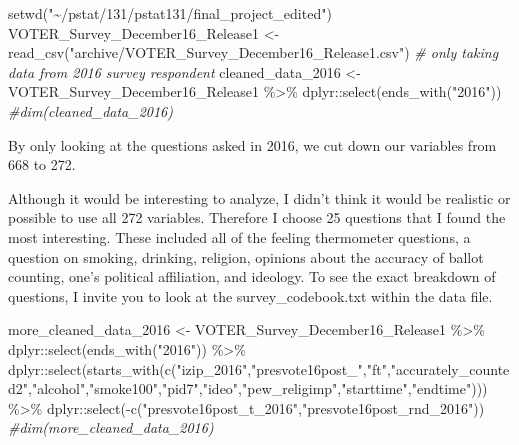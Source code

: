 \documentclass[
]{article}
\newenvironment{Shaded}{\begin{snugshade}}{\end{snugshade}}
\newcommand{\CommentTok}[1]{\textcolor[rgb]{0.56,0.35,0.01}{\textit{#1}}}
\newcommand{\FunctionTok}[1]{\textcolor[rgb]{0.00,0.00,0.00}{#1}}
\newcommand{\NormalTok}[1]{#1}
\newcommand{\OtherTok}[1]{\textcolor[rgb]{0.56,0.35,0.01}{#1}}
\newcommand{\SpecialCharTok}[1]{\textcolor[rgb]{0.00,0.00,0.00}{#1}}
\newcommand{\StringTok}[1]{\textcolor[rgb]{0.31,0.60,0.02}{#1}}
\begin{document}
\begin{Shaded}
\begin{Highlighting}[]
\FunctionTok{setwd}\NormalTok{(}\StringTok{"\textasciitilde{}/pstat/131/pstat131/final\_project\_edited"}\NormalTok{)}
\NormalTok{VOTER\_Survey\_December16\_Release1 }\OtherTok{\textless{}{-}} \FunctionTok{read\_csv}\NormalTok{(}\StringTok{"archive/VOTER\_Survey\_December16\_Release1.csv"}\NormalTok{)}
\CommentTok{\# only taking data from 2016 survey respondent }
\NormalTok{cleaned\_data\_2016 }\OtherTok{\textless{}{-}}\NormalTok{ VOTER\_Survey\_December16\_Release1 }\SpecialCharTok{\%\textgreater{}\%}
\NormalTok{  dplyr}\SpecialCharTok{::}\FunctionTok{select}\NormalTok{(}\FunctionTok{ends\_with}\NormalTok{(}\StringTok{"2016"}\NormalTok{))}
\CommentTok{\#dim(cleaned\_data\_2016)}
\end{Highlighting}
\end{Shaded}

By only looking at the questions asked in 2016, we cut down our
variables from 668 to 272.

Although it would be interesting to analyze, I didn't think it would be
realistic or possible to use all 272 variables. Therefore I choose 25
questions that I found the most interesting. These included all of the
feeling thermometer questions, a question on smoking, drinking,
religion, opinions about the accuracy of ballot counting, one's
political affiliation, and ideology. To see the exact breakdown of
questions, I invite you to look at the survey\_codebook.txt within the
data file.

\begin{Shaded}
\begin{Highlighting}[]
\NormalTok{more\_cleaned\_data\_2016 }\OtherTok{\textless{}{-}}\NormalTok{ VOTER\_Survey\_December16\_Release1 }\SpecialCharTok{\%\textgreater{}\%}
\NormalTok{  dplyr}\SpecialCharTok{::}\FunctionTok{select}\NormalTok{(}\FunctionTok{ends\_with}\NormalTok{(}\StringTok{"2016"}\NormalTok{)) }\SpecialCharTok{\%\textgreater{}\%}
\NormalTok{  dplyr}\SpecialCharTok{::}\FunctionTok{select}\NormalTok{(}\FunctionTok{starts\_with}\NormalTok{(}\FunctionTok{c}\NormalTok{(}\StringTok{"izip\_2016"}\NormalTok{,}\StringTok{"presvote16post\_"}\NormalTok{,}\StringTok{"ft"}\NormalTok{,}\StringTok{"accurately\_counted2"}\NormalTok{,}\StringTok{"alcohol"}\NormalTok{,}\StringTok{"smoke100"}\NormalTok{,}\StringTok{"pid7"}\NormalTok{,}\StringTok{"ideo"}\NormalTok{,}\StringTok{"pew\_religimp"}\NormalTok{,}\StringTok{"starttime"}\NormalTok{,}\StringTok{"endtime"}\NormalTok{))) }\SpecialCharTok{\%\textgreater{}\%}
\NormalTok{  dplyr}\SpecialCharTok{::}\FunctionTok{select}\NormalTok{(}\SpecialCharTok{{-}}\FunctionTok{c}\NormalTok{(}\StringTok{"presvote16post\_t\_2016"}\NormalTok{,}\StringTok{"presvote16post\_rnd\_2016"}\NormalTok{))}
\CommentTok{\#dim(more\_cleaned\_data\_2016)}
\end{Highlighting}
\end{Shaded}
\end{document}
